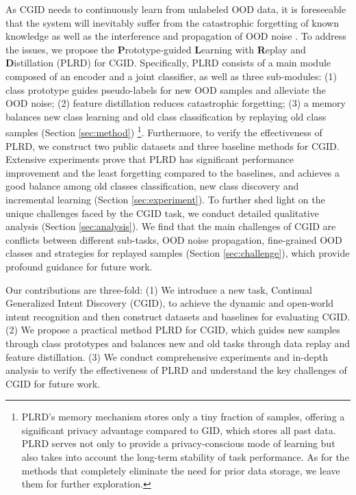 \documentclass[11pt]{article}
\begin{document}
As CGID needs to continuously learn from unlabeled OOD data, it is foreseeable that the system will inevitably suffer from the catastrophic forgetting \cite{biesialska2020continual,masana2022class} of known knowledge as well as the interference and propagation of OOD noise \cite{wu2021ngc}. To address the issues, we propose the \textbf{P}rototype-guided \textbf{L}earning with \textbf{R}eplay and \textbf{D}istillation (PLRD) for CGID.  
Specifically, PLRD consists of a main module composed of an encoder and a joint classifier, as well as three sub-modules: (1) class prototype guides pseudo-labels for new OOD samples and alleviate the OOD noise; (2) feature distillation reduces catastrophic forgetting; (3) a memory balances new class learning and old class classification by replaying old class samples (Section \ref{sec:method}) \footnote{PLRD's memory mechanism stores only a tiny fraction of samples, offering a significant privacy advantage compared to GID, which stores all past data. PLRD serves not only to provide a privacy-conscious mode of learning but also takes into account the long-term stability of task performance. As for the methods that completely eliminate the need for prior data storage, we leave them for further exploration.}.
Furthermore, to verify the effectiveness of PLRD, we construct two public datasets and three baseline methods for CGID. Extensive experiments prove that PLRD has significant performance improvement and the least forgetting compared to the baselines, and achieves a good balance among old classes classification, new class discovery and incremental learning (Section \ref{sec:experiment}). 
To further shed light on the unique challenges faced by the CGID task, we conduct detailed qualitative analysis  (Section \ref{sec:analysis}). 
We find that the main challenges of CGID are conflicts between different sub-tasks, OOD noise propagation, fine-grained OOD classes and strategies for replayed samples (Section \ref{sec:challenge}), which provide profound guidance for future work.

Our contributions are three-fold: (1) We introduce a new task, Continual Generalized Intent Discovery (CGID), to achieve the dynamic and open-world intent recognition and then construct datasets and baselines for evaluating CGID. (2) We propose a practical method PLRD for CGID, which guides new samples through class prototypes and balances new and old tasks through data replay and feature distillation. (3) We conduct comprehensive experiments and in-depth analysis to verify the effectiveness of PLRD and understand the key challenges of CGID for future work.
\end{document}
